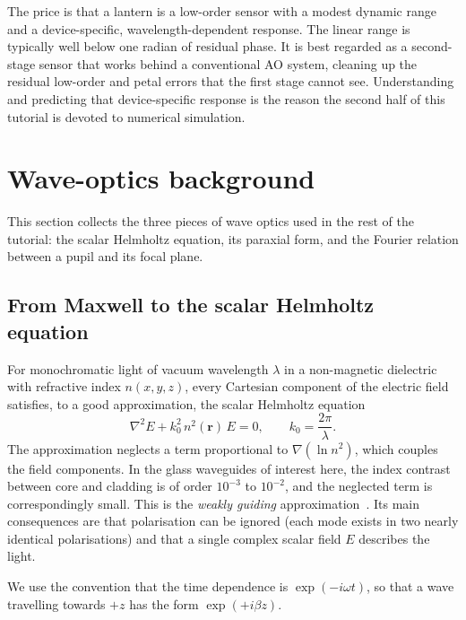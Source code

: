 \documentclass[11pt,a4paper]{article}
\newcommand{\rvec}{\mathbf{r}}
\begin{document}
The price is that a lantern is a low-order sensor with a modest dynamic range and a device-specific, wavelength-dependent response. The linear range is typically well below one radian of residual phase. It is best regarded as a second-stage sensor that works behind a conventional AO system, cleaning up the residual low-order and petal errors that the first stage cannot see. Understanding and predicting that device-specific response is the reason the second half of this tutorial is devoted to numerical simulation.

\section{Wave-optics background}
This section collects the three pieces of wave optics used in the rest of the tutorial: the scalar Helmholtz equation, its paraxial form, and the Fourier relation between a pupil and its focal plane.

\subsection{From Maxwell to the scalar Helmholtz equation}
For monochromatic light of vacuum wavelength $\lambda$ in a non-magnetic dielectric with refractive index $n(x,y,z)$, every Cartesian component of the electric field satisfies, to a good approximation, the scalar Helmholtz equation
\begin{equation}
\nabla^2 E + k_0^2\, n^2(\rvec)\, E = 0,
\qquad k_0 = \frac{2\pi}{\lambda}.
\label{eq:helmholtz}
\end{equation}
The approximation neglects a term proportional to $\nabla(\ln n^2)$, which couples the field components. In the glass waveguides of interest here, the index contrast between core and cladding is of order $10^{-3}$ to $10^{-2}$, and the neglected term is correspondingly small. This is the \emph{weakly guiding} approximation~\cite{SnyderLove,Gloge1971}. Its main consequences are that polarisation can be ignored (each mode exists in two nearly identical polarisations) and that a single complex scalar field $E$ describes the light.

We use the convention that the time dependence is $\exp(-i\omega t)$, so that a wave travelling towards $+z$ has the form $\exp(+i\beta z)$.
\end{document}
